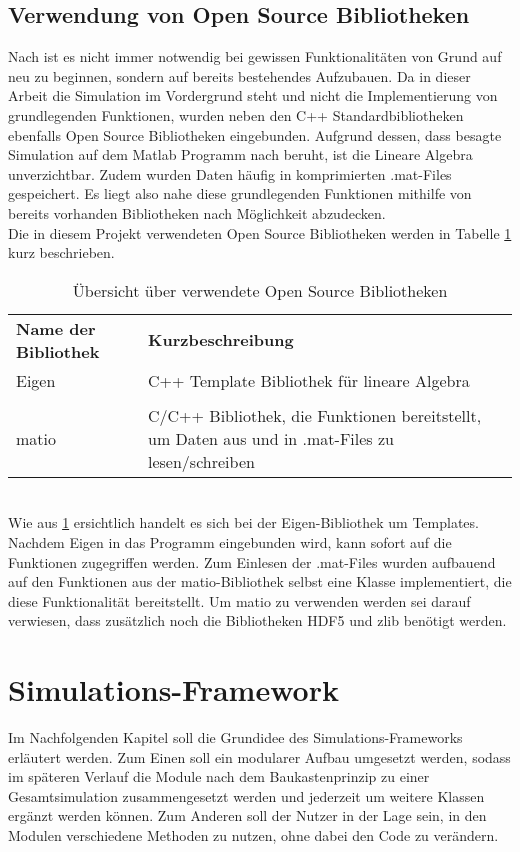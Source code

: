 \section{Verwendung von Open Source Bibliotheken}
\label{sec:OSBib}
Nach  \cite{Kessler.Wintersemester201718}  ist es nicht immer notwendig bei gewissen Funktionalitäten von Grund auf neu zu beginnen, sondern auf bereits bestehendes Aufzubauen.
Da in dieser Arbeit die Simulation im Vordergrund steht und nicht die Implementierung von grundlegenden Funktionen, wurden neben den C++ Standardbibliotheken ebenfalls Open Source Bibliotheken eingebunden. Aufgrund dessen, dass besagte Simulation auf dem Matlab Programm nach \cite{Olucak.15.02.2017} beruht, ist die Lineare Algebra unverzichtbar. Zudem wurden Daten häufig in komprimierten .mat-Files gespeichert. Es liegt also nahe diese grundlegenden Funktionen mithilfe von bereits vorhanden Bibliotheken nach Möglichkeit abzudecken.
\\Die in diesem Projekt verwendeten Open Source Bibliotheken werden in Tabelle \ref{tab:openSource} kurz beschrieben.
\begin{table}[h]
	\centering	\begin{tabular}{l p{10cm}}
		\textbf{Name der Bibliothek} & \textbf{Kurzbeschreibung}\\
		Eigen &  C++ Template Bibliothek für lineare Algebra \cite{TuxFamily.2018}\\\\
		matio & C/C++ Bibliothek, die Funktionen bereitstellt, um Daten aus und in .mat-Files zu lesen/schreiben \cite{Hulbert.2013}
	\end{tabular}
	\caption{Übersicht über verwendete Open Source Bibliotheken}
	\label{tab:openSource}
\end{table}\\
Wie aus \ref{tab:openSource} ersichtlich handelt es sich bei der Eigen-Bibliothek um Templates. Nachdem Eigen in das Programm eingebunden wird, kann sofort auf die Funktionen zugegriffen werden. Zum Einlesen der .mat-Files wurden aufbauend auf den  Funktionen aus der matio-Bibliothek selbst eine Klasse implementiert, die diese Funktionalität bereitstellt. Um matio zu verwenden werden sei darauf verwiesen, dass zusätzlich noch die Bibliotheken HDF5 und zlib benötigt werden. 



\chapter{Simulations-Framework}
\label{ch:Simulations-Framework}
Im Nachfolgenden Kapitel soll die Grundidee des Simulations-Frameworks erläutert werden. Zum Einen soll ein modularer Aufbau umgesetzt werden, sodass im späteren Verlauf die Module nach dem Baukastenprinzip zu einer Gesamtsimulation zusammengesetzt werden und jederzeit um weitere Klassen ergänzt werden können. Zum Anderen soll der Nutzer in der Lage sein, in den Modulen verschiedene Methoden zu nutzen, ohne dabei den Code zu verändern.
